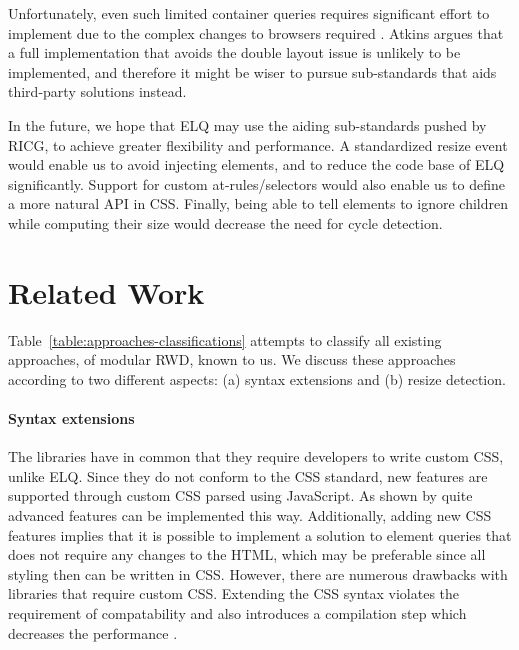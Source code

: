 \documentclass{acm_proc_article-sp}
\newcommand{\elq}{ELQ}
\newcommand{\gls}[1]{#1}
\begin{document}
    Unfortunately, even such limited container queries requires significant effort to implement due to the complex changes to browsers required \cite{ricg_issue_viewport}.
    Atkins argues that a full implementation that avoids the double layout issue is unlikely to be implemented, and therefore it might be wiser to pursue sub-standards that aids third-party solutions instead.
   
    In the future, we hope that \elq{} may use the aiding sub-standards pushed by RICG, to achieve greater flexibility and performance.
    A standardized resize event would enable us to avoid injecting elements, and to reduce the code base of \elq{} significantly.
    Support for custom at-rules/selectors would also enable us to define a more natural API in CSS.
    Finally, being able to tell elements to ignore children while computing their size would decrease the need for cycle detection.


\section{Related Work}\label{sec:related}
  Table~\ref{table:approaches-classifications} attempts to classify all existing approaches, of modular RWD, known to us. 
  We discuss these approaches according to two different aspects: (a) syntax extensions and (b) resize detection.

  \paragraph{Syntax extensions}
  The libraries \cite{eq_imp_magichtml,eq_imp_eqcss,eq_imp_prollyfill-min-width,eq_imp_localised-css,eq_imp_gss} have in common that they require developers to write custom \gls{CSS}, unlike \elq{}.
  Since they do not conform to the \gls{CSS} standard, new features are supported through custom \gls{CSS} parsed using JavaScript.
  As shown by \cite{eq_imp_eqcss,eq_imp_gss} quite advanced features can be implemented this way.
  Additionally, adding new \gls{CSS} features implies that it is possible to implement a solution to element queries that does not require any changes to the \gls{HTML}, which may be preferable since all styling then can be written in \gls{CSS}.
  However, there are numerous drawbacks with libraries that require custom \gls{CSS}.
  Extending the CSS syntax violates the requirement of compatability and also introduces a compilation step which decreases the performance \cite{elq-thesis}.
\end{document}
